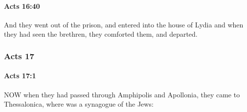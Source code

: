		\paragraph{Acts 16:40} %
			\label{ACTS-16-40}

			And they went out of the prison, and entered into the house of Lydia and when they had seen the brethren, they comforted them, and departed.

			\begin{framed}
			\scriptsize
				\begin{compactdesc}
					\item[SBLG] 
				\end{compactdesc}
			\end{framed}

	\subsubsection{Acts 17} %
		\label{ACTS-17}
		
		\paragraph{Acts 17:1} %
			\label{ACTS-17-1}

			NOW when they had passed through Amphipolis and Apollonia, they came to Thessalonica, where was a synagogue of the Jews:

